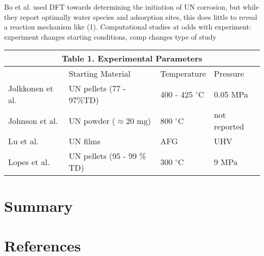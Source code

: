 \documentclass[3p,review,11pt]{elsarticle}
\begin{document}
Bo et al. \cite{Bo2016} used DFT towards determining the initiation of UN corrosion, but while they report optimally water species and adsorption sites, this does little to reveal a reaction mechanism like (1).
Computational studies at odds with experiment: experiment changes starting conditions, comp changes type of study


\begin{tabular}{ |p{3cm}|p{3cm}|p{3cm}|p{3cm}|  }
	\hline
	\multicolumn{4}{|c|}{\textbf{Table 1.} Experimental Parameters} \\
	\hline
	 & Starting Material &Temperature & Pressure\\
	\hline
	Jolkkonen et al. \cite{Jolkkonen2017}   &  UN pellets (77 - 97\%TD) &400 - 425 $^{\circ}$C&  0.05 MPa \\
	Johnson et al. \cite{Johnson2016}   & UN powder ($\approx$20 mg)     &800 $^{\circ}$C&  not reported \\
	Lu et al. \cite{Lu2016}  & UN films    &AFG&   UHV \\
	Lopes et al. \cite{Lopes2017}   & UN pellets (95 - 99 \% TD)    & 300 $^{\circ}$C&   9 MPa \\
	\hline
\end{tabular}
\section{Summary}











\section*{References}




\end{document}
